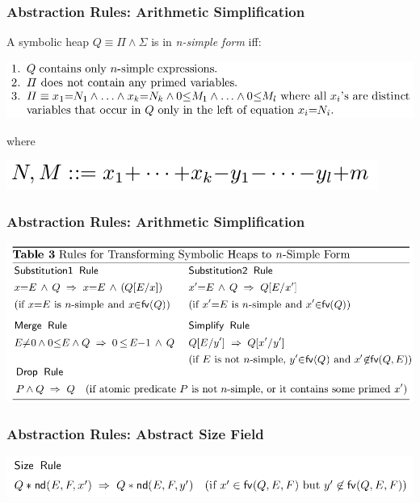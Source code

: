 \documentclass[aspectratio=1610, 13pt]{beamer}
\begin{document}
\begin{frame}\frametitle{Abstraction Rules: Arithmetic Simplification}
A symbolic heap $Q\equiv \Pi \wedge \Sigma$ is in \emph{n-simple form} iff:
\begin{center}
\includegraphics[scale=0.4]{n-simple.png}

\end{center}
where 
\begin{center}

\includegraphics[scale=0.4]{mn.png}
\end{center}

\end{frame}

\begin{frame}\frametitle{Abstraction Rules: Arithmetic Simplification}
\begin{center}
\includegraphics[scale=0.4]{arithrule.png}
\end{center}
\end{frame}

\begin{frame}\frametitle{Abstraction Rules: Abstract Size Field}
\begin{center}
\includegraphics[scale=0.4]{size.png}
\end{center}
\end{frame}
\end{document}

